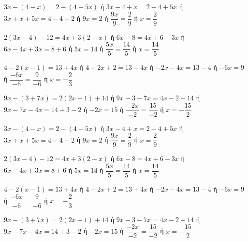 \begin{alist}
\item $ 3x-(4-x)=2-(4-5x) $ ή $ 3x-4+x=2-4+5x $ ή $ 3x+x+5x=4-4+2 $ ή $ 9x=2 $ ή $ \dfrac{9x}{9}=\dfrac{2}{9} $ ή $ x=\dfrac{2}{9} $
\item $ 2(3x-4)-12=4x+3(2-x) $ ή $ 6x-8=4x+6-3x $ ή $ 6x-4x+3x=8+6 $ ή $ 5x=14 $ ή $ \dfrac{5x}{5}=\dfrac{14}{5} $ ή $ x=\dfrac{14}{5} $
\item $ 4-2(x-1)=13+4x $ ή $ 4-2x+2=13+4x $ ή $ -2x-4x=13-4 $ ή $ -6x=9 $ ή $ \dfrac{-6x}{-6}=\dfrac{9}{-6} $ ή $ x=-\dfrac{2}{3} $
\item $ 9x-(3+7x)=2(2x-1)+14 $ ή $ 9x-3-7x=4x-2+14 $ ή $ 9x-7x-4x=14+3-2 $ ή $ -2x=15 $ ή $ \dfrac{-2x}{-2}=\dfrac{15}{-2} $ ή $ x=-\dfrac{15}{2} $
\end{alist}
\begin{alist}
\item $ 3x-(4-x)=2-(4-5x) $ ή $ 3x-4+x=2-4+5x $ ή $ 3x+x+5x=4-4+2 $ ή $ 9x=2 $ ή $ \dfrac{9x}{9}=\dfrac{2}{9} $ ή $ x=\dfrac{2}{9} $
\item $ 2(3x-4)-12=4x+3(2-x) $ ή $ 6x-8=4x+6-3x $ ή $ 6x-4x+3x=8+6 $ ή $ 5x=14 $ ή $ \dfrac{5x}{5}=\dfrac{14}{5} $ ή $ x=\dfrac{14}{5} $
\item $ 4-2(x-1)=13+4x $ ή $ 4-2x+2=13+4x $ ή $ -2x-4x=13-4 $ ή $ -6x=9 $ ή $ \dfrac{-6x}{-6}=\dfrac{9}{-6} $ ή $ x=-\dfrac{2}{3} $
\item $ 9x-(3+7x)=2(2x-1)+14 $ ή $ 9x-3-7x=4x-2+14 $ ή $ 9x-7x-4x=14+3-2 $ ή $ -2x=15 $ ή $ \dfrac{-2x}{-2}=\dfrac{15}{-2} $ ή $ x=-\dfrac{15}{2} $
\end{alist}
